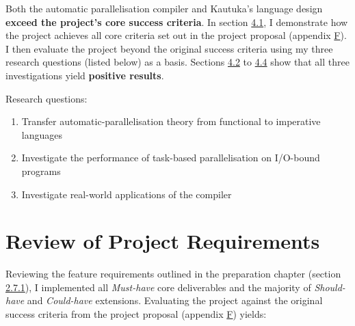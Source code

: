 \label{sec:4}

Both the automatic parallelisation compiler and Kautuka's language design \textbf{exceed the project's core success criteria}. In section \hyperref[sec:4.1]{4.1}, I demonstrate how the project achieves all core criteria set out in the project proposal (appendix \hyperref[sec:F]{F}). I then evaluate the project beyond the original success criteria using my three research questions (listed below) as a basis. Sections \hyperref[sec:4.2]{4.2} to \hyperref[sec:4.4]{4.4} show that all three investigations yield \textbf{positive results}.

\vspace{1mm}

Research questions:
\vspace{-5mm}

\begin{enumerate}
  \setlength{\itemsep}{2pt}
        \setlength{\parskip}{0pt}
        \setlength{\parsep}{0pt}
  \item Transfer automatic-parallelisation theory from functional to imperative languages
  \item Investigate the performance of task-based parallelisation on I/O-bound programs
  \item Investigate real-world applications of the compiler
\end{enumerate}

\vspace{-3mm}

\section{Review of Project Requirements}

\label{sec:4.1}

Reviewing the feature requirements outlined in the preparation chapter (section \hyperref[sec:2.7.1]{2.7.1}), I implemented all \textit{Must-have} core deliverables and the majority of \textit{Should-have} and \textit{Could-have} extensions. Evaluating the project against the original success criteria from the project proposal (appendix \hyperref[sec:F]{F}) yields:

